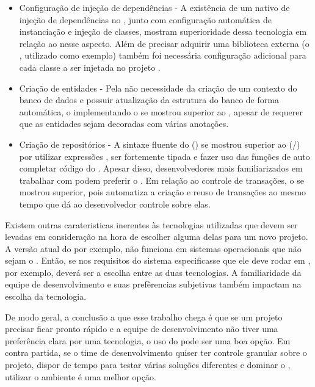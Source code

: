 \begin{itemize}
  \item Configuração de injeção de dependências - A existência de um  nativo de injeção de dependências no , junto com configuração automática de instanciação e injeção de classes, mostram superioridade dessa tecnologia em relação ao  nesse aspecto. Além de precisar adquirir uma biblioteca externa (o , utilizado como exemplo) também foi necessária configuração adicional para cada classe a ser injetada no projeto .
  \item Criação de entidades - Pela não necessidade da criação de um contexto do banco de dados e possuir atualização da estrutura do banco de forma automática, o  implementando o  se mostrou superior ao , apesar de requerer que as entidades sejam decoradas com várias anotações.
  \item Criação de repositórios - A sintaxe fluente do  () se mostrou superior ao  (/) por utilizar expressões , ser fortemente tipada e fazer uso das funções de auto completar código do . Apesar disso, desenvolvedores mais familiarizados em trabalhar com   podem preferir o . Em relação ao controle de transações, o  se mostrou superior, pois automatiza a criação e reuso de transações ao mesmo tempo que dá ao desenvolvedor controle sobre elas. 
\end{itemize}

Existem outras carateristicas inerentes às tecnologias utilizadas que devem ser levadas em consideração na hora de escolher alguma delas para um novo projeto. A versão atual do  por exemplo, não funciona em sistemas operacionais que não sejam o . Então, se nos requisitos do sistema especificasse que ele deve rodar em , por exemplo,  deverá ser a escolha entre as duas tecnologias. A familiaridade da equipe de desenvolvimento e suas prefêrencias subjetivas também impactam na escolha da tecnologia.

De modo geral, a conclusão a que esse trabalho chega é que se um projeto precisar ficar pronto rápido e a equipe de desenvolvimento não tiver uma preferência clara por uma tecnologia, o uso do  pode ser uma boa opção. Em contra partida, se o time de desenvolvimento quiser ter controle granular sobre o projeto, dispor de tempo para testar várias soluções diferentes e dominar o , utilizar o ambiente  é uma melhor opção.

